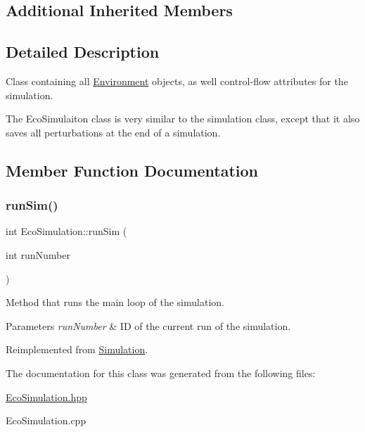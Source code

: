 \subsection*{Additional Inherited Members}


\subsection{Detailed Description}
Class containing all \hyperlink{classEnvironment}{Environment} objects, as well control-\/flow attributes for the simulation. 

The Eco\+Simulaiton class is very similar to the simulation class, except that it also saves all perturbations at the end of a simulation. 

\subsection{Member Function Documentation}
\mbox{\label{classEcoSimulation_a72ec5e7dffb4231b2cb363b632788622}} 
\subsubsection{\texorpdfstring{run\+Sim()}{runSim()}}
{\footnotesize\ttfamily int Eco\+Simulation\+::run\+Sim (\begin{DoxyParamCaption}\item[{int}]{run\+Number }\end{DoxyParamCaption})\hspace{0.3cm}{\ttfamily [virtual]}}



Method that runs the main loop of the simulation. 


\begin{DoxyParams}{Parameters}
{\em run\+Number} & ID of the current run of the simulation. \\
\hline
\end{DoxyParams}


Reimplemented from \hyperlink{classSimulation_a7eb16da89581b496d33b77efbb63b9cd}{Simulation}.



The documentation for this class was generated from the following files\+:\begin{DoxyCompactItemize}
\item 
\hyperlink{EcoSimulation_8hpp}{Eco\+Simulation.\+hpp}\item 
Eco\+Simulation.\+cpp\end{DoxyCompactItemize}
